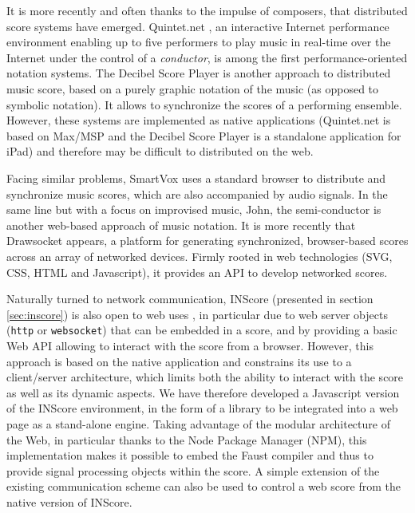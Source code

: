 \documentclass{article}
\newcommand{\icode}[1]	{{\small \texttt{#1}}}
\begin{document}
It is more recently and often thanks to the impulse of composers, that distributed score systems have emerged.
Quintet.net \cite{doi:10.1162/leon.2005.38.1.23}, an interactive Internet performance environment enabling up to five performers to play music in real-time over the Internet under the control of a \emph{conductor}, is among the first performance-oriented notation systems. 
The Decibel Score Player \cite{Hope_tenor2015} is another approach to distributed music score, based on a purely graphic notation of the music (as opposed to symbolic notation). It allows to synchronize the scores of a performing ensemble.
However, these systems are implemented as native applications (Quintet.net is based on Max/MSP and the Decibel Score Player is a standalone application for iPad) and therefore may be difficult to distributed on the web.

Facing similar problems, SmartVox \cite{bell:hal-01660184} uses a standard browser to distribute and synchronize music scores, which are also accompanied by audio signals. In the same line but with a focus on improvised music, John, the semi-conductor\cite{goudard:hal-01923258} is another web-based approach of music notation.
It is more recently that Drawsocket \cite{Gottfried_tenor2019} appears, a platform for generating synchronized, browser-based scores across an array of networked devices. Firmly rooted in web technologies (SVG, CSS, HTML and Javascript), it provides an API to develop networked scores.

Naturally turned to network communication, INScore \cite{Fober:12a} (presented in section \ref{sec:inscore}) is also open to web uses \cite{Fober:15b}, in particular due to web server objects (\icode{http} or \icode{websocket}) that can be embedded in a score, and by providing a basic Web API allowing to interact with the score from a browser. 
However, this approach is based on the native application and constrains its use to a client/server architecture, which limits both the ability to interact with the score as well as its dynamic aspects. 
We have therefore developed a Javascript version of the INScore environment, in the form of a library to be integrated into a web page as a stand-alone engine. 
Taking advantage of the modular architecture of the Web, in particular thanks to the Node Package Manager (NPM), this implementation makes it possible to embed the Faust compiler \cite{orlarey:hal-02159014} \cite{ren:hal-03087763} and thus to provide signal processing objects within the score.
A simple extension of the existing communication scheme can also be used to control a web score from the native version of INScore.
\end{document}

